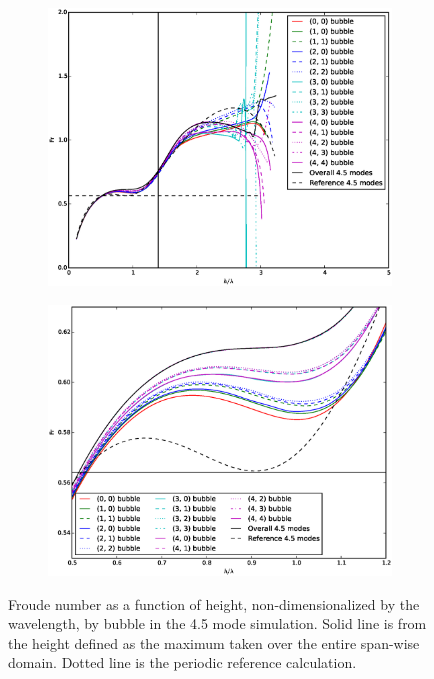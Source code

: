 \begin{figure}
\begin{subfigure}[b]{0.5\textwidth}
  \includegraphics[width=\textwidth]{plts/walls_Fr}
\end{subfigure}
\begin{subfigure}[b]{0.5\textwidth}
  \includegraphics[width=\textwidth]{plts/walls_Fr_zoom}
\end{subfigure}
\caption{  
Froude number as a function of height, non-dimensionalized by the wavelength, by bubble in the 4.5 mode simulation.
Solid line is from the height defined as the maximum taken over the entire span-wise domain.
Dotted line is the periodic reference calculation.
}
\end{figure}

